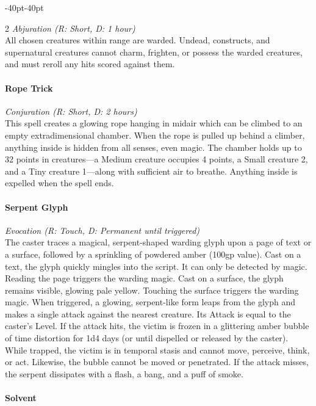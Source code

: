 \documentclass{book}
\begin{document}
\begin{adjustwidth}{-40pt}{-40pt}
\begin{multicols}{2}
\emph{Abjuration (R: Short, D: 1 hour)}\\
All chosen creatures within range are warded. Undead, constructs, and
supernatural creatures cannot charm, frighten, or possess the warded
creatures, and must reroll any hits scored against them.

\paragraph{Rope Trick}\label{rope-trick}

\emph{Conjuration (R: Short, D: 2 hours)}\\
This spell creates a glowing rope hanging in midair which can be climbed
to an empty extradimensional chamber. When the rope is pulled up behind
a climber, anything inside is hidden from all senses, even magic. The
chamber holds up to 32 points in creatures---a Medium creature occupies
4 points, a Small creature 2, and a Tiny creature 1---along with
sufficient air to breathe. Anything inside is expelled when the spell
ends.

\paragraph{Serpent Glyph}\label{serpent-glyph}

\emph{Evocation (R: Touch, D: Permanent until triggered)}\\
The caster traces a magical, serpent-shaped warding glyph upon a page of
text or a surface, followed by a sprinkling of powdered amber (100gp
value). Cast on a text, the glyph quickly mingles into the script. It
can only be detected by magic. Reading the page triggers the warding
magic. Cast on a surface, the glyph remains visible, glowing pale
yellow. Touching the surface triggers the warding magic. When triggered,
a glowing, serpent-like form leaps from the glyph and makes a single
attack against the nearest creature. Its Attack is equal to the caster's
Level. If the attack hits, the victim is frozen in a glittering amber
bubble of time distortion for 1d4 days (or until dispelled or released
by the caster). While trapped, the victim is in temporal stasis and
cannot move, perceive, think, or act. Likewise, the bubble cannot be
moved or penetrated. If the attack misses, the serpent dissipates with a
flash, a bang, and a puff of smoke.

\paragraph{Solvent}\label{solvent}


\end{multicols}
\end{adjustwidth}
\end{document}
